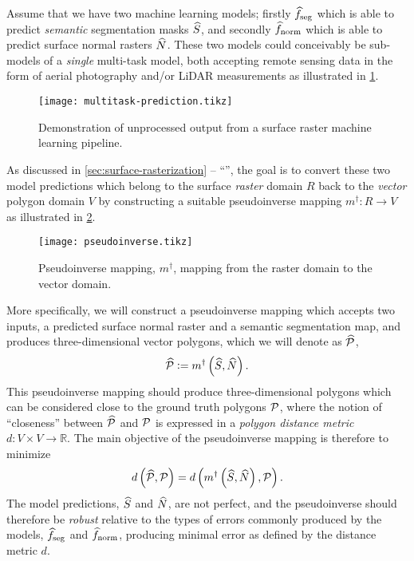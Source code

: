 Assume that we have two machine learning models; firstly $\widehat{f}_{\mathrm{seg}}$ which is able to predict \emph{semantic} segmentation masks $\widehat{S}$, and secondly $\widehat{f}_{\mathrm{norm}}$ which is able to predict surface normal rasters $\widehat{N}$.
These two models could conceivably be sub-models of a \emph{single} multi-task model, both accepting remote sensing data in the form of aerial photography and/or LiDAR measurements as illustrated in \cref{fig:multitask-prediction}.
\begin{figure}[H]
  \centering
  \texttt{[image: multitask-prediction.tikz]}
  \caption{%
    Demonstration of unprocessed output from a surface raster machine learning pipeline.
  }%
  \label{fig:multitask-prediction}
\end{figure}
\noindent
As discussed in \cref{sec:surface-rasterization} -- \enquote{}, the goal is to convert these two model predictions which belong to the surface \emph{raster} domain $R$ back to the \emph{vector} polygon domain $V$ by constructing a suitable pseudoinverse mapping $m^{\dagger}: R \rightarrow V$ as illustrated in \cref{fig:pseudoinverse}.
\begin{figure}[H]
  \centering
  \texttt{[image: pseudoinverse.tikz]}
  \caption{Pseudoinverse mapping, $m^{\dagger}$, mapping from the raster domain to the vector domain.}%
  \label{fig:pseudoinverse}
\end{figure}
\noindent
More specifically, we will construct a pseudoinverse mapping which accepts two inputs, a predicted surface normal raster and a semantic segmentation map, and produces three-dimensional vector polygons, which we will denote as $\widehat{\mathcal{P}}$,
\begin{equation*}
  \widehat{\mathcal{P}}
  \vcentcolon=
  m^{\dagger}\left(
    \widehat{S},
    \widehat{N}
  \right).
\end{equation*}
This pseudoinverse mapping should produce three-dimensional polygons which can be considered close to the ground truth polygons $\mathcal{P}$, where the notion of \enquote{closeness} between $\widehat{\mathcal{P}}$ and $\mathcal{P}$ is expressed in a \textit{polygon distance metric} $d: V \times V \rightarrow \mathbb{R}$.
The main objective of the pseudoinverse mapping is therefore to minimize
\begin{equation*}
  d\left(
    \widehat{\mathcal{P}},
    \mathcal{P}
  \right)
  =
  d\left(
    m^{\dagger}\left(\widehat{S}, \widehat{N}\right),
    \mathcal{P}
  \right).
\end{equation*}
The model predictions, $\widehat{S}$ and $\widehat{N}$, are not perfect, and the pseudoinverse should therefore be \textit{robust} relative to the types of errors commonly produced by the models, $\widehat{f}_{\mathrm{seg}}$ and $\widehat{f}_{\mathrm{norm}}$, producing minimal error as defined by the distance metric $d$.
